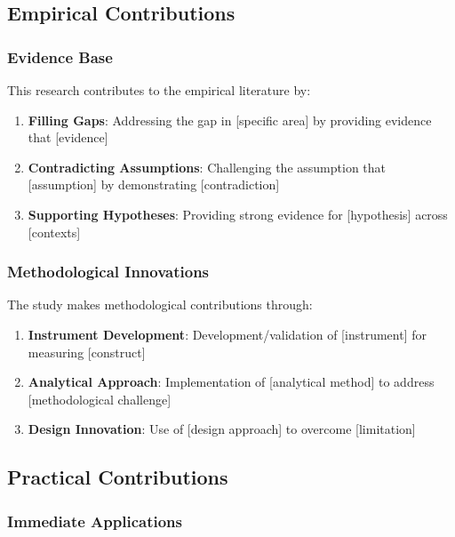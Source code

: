 \documentclass[
  12pt,
  letterpaper,
  12pt,
  letterpaper,
  oneside]{report}
\providecommand{\tightlist}{%
  \setlength{\itemsep}{0pt}\setlength{\parskip}{0pt}}
\begin{document}
\subsection{Empirical Contributions}\label{empirical-contributions}

\subsubsection{Evidence Base}\label{evidence-base}

This research contributes to the empirical literature by:

\begin{enumerate}
\def\labelenumi{\arabic{enumi}.}
\tightlist
\item
  \textbf{Filling Gaps}: Addressing the gap in {[}specific area{]} by
  providing evidence that {[}evidence{]}
\item
  \textbf{Contradicting Assumptions}: Challenging the assumption that
  {[}assumption{]} by demonstrating {[}contradiction{]}
\item
  \textbf{Supporting Hypotheses}: Providing strong evidence for
  {[}hypothesis{]} across {[}contexts{]}
\end{enumerate}

\subsubsection{Methodological
Innovations}\label{methodological-innovations-1}

The study makes methodological contributions through:

\begin{enumerate}
\def\labelenumi{\arabic{enumi}.}
\tightlist
\item
  \textbf{Instrument Development}: Development/validation of
  {[}instrument{]} for measuring {[}construct{]}
\item
  \textbf{Analytical Approach}: Implementation of {[}analytical
  method{]} to address {[}methodological challenge{]}
\item
  \textbf{Design Innovation}: Use of {[}design approach{]} to overcome
  {[}limitation{]}
\end{enumerate}

\subsection{Practical Contributions}\label{practical-contributions}

\subsubsection{Immediate Applications}\label{immediate-applications-1}
\end{document}
